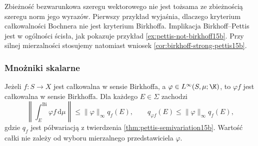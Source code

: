 \begin{uwaga}
Zbieżność bezwarunkowa szeregu wektorowego nie jest
tożsama ze zbieżnością szeregu norm jego wyrazów.
Pierwszy przykład wyjaśnia, dlaczego kryterium
całkowalności Bochnera nie jest kryterium Birkhoffa.
Implikacja Birkhoff--Pettis jest w ogólności ścisła,
jak pokazuje przykład \ref{ex:pettis-not-birkhoff15b}.
Przy silnej mierzalności stosujemy natomiast wniosek
\ref{cor:birkhoff-strong-pettis15b}.
\end{uwaga}

\subsubsection{Mnożniki skalarne}

\begin{twierdzenie}
\label{thm:birkhoff-multipliers15b}
Jeżeli $f:S\to X$ jest całkowalna w sensie Birkhoffa,
a $\varphi\in L^\infty(S,\mu;\K)$, to $\varphi f$
jest całkowalna w sensie Birkhoffa. Dla każdego
$E\in\Sigma$ zachodzi
\[
 \left\|\int_E^{\mathrm{Bi}}\varphi f\,\mathrm d\mu\right\|
 \le\|\varphi\|_\infty q_f(E),\qquad
 q_{\varphi f}(E)\le\|\varphi\|_\infty q_f(E),
\]
gdzie $q_f$ jest półwariacją z twierdzenia
\ref{thm:pettis-semivariation15b}. Wartość całki nie
zależy od wyboru mierzalnego przedstawiciela $\varphi$.
\end{twierdzenie}
